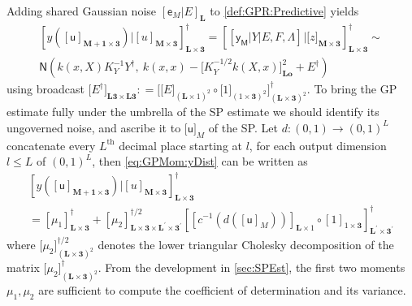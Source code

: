 \documentclass[preprint,12pt]{elsarticle}
\newcommand*{\M}[1]{\ensuremath{#1}\xspace}
\newcommand*{\x}{\times}
\newcommand*{\mi}[1]{\mathbf{#1}}
\newcommand*{\rv}[1]{\mathsf{#1}}
\newcommand*{\te}[2][]{\left\lbrack{#2}\right\rbrack_{#1}}
\newcommand*{\tte}[2][]{\lbrack{#2}\rbrack_{#1}}
\newcommand*{\deq}{\M{\mathrel{\mathop:}=}}
\newcommand*{\gauss}[2]{\mathsf{N}\!\left({#1,#2}\right)}
\begin{document}
    Adding shared Gaussian noise $\te[\mi{L}]{\rv{e}_M\vert E}$ to \cref{def:GPR:Predictive} yields
    \begin{multline}\label{eq:GPMom:yDist}
        \te[\mi{L\x 3}]{y(\te[\mi{M+1\x 3}]{\rv{u}}) \big\vert \te[\mi{M\x 3}]{u}}^{\dagger} 
        = \te[\mi{L\x 3}]{\te{\rv{y_M} \vert Y \vert E,F,\Lambda} \big\vert \tte[\mi{M\x 3}]{z}}^{\dagger} \sim \\
        \gauss{k(x,X) K_{Y}^{-1} Y^{\dagger}}{\ k(x,x) - \tte[\mi{Lo}]{K_{Y}^{-1/2} k(X,x)}^{2} + E^{\dagger}}
    \end{multline}
    using broadcast $\tte[\mi{L3\x L3}]{E^{\dagger}} \deq \tte[(\mi{L\x 3})^{2}]{\tte[(\mi{L}\x 1)^{2}]{E} \circ \tte[(1\x\mi{3})^{2}]{1}}^{\dagger}$. 
    To bring the GP estimate fully under the umbrella of the SP estimate we should identify its ungoverned noise, and ascribe it to $\tte[M]{\rv{u}}$ of the SP.
    Let $d\colon (0,1) \to (0,1)^{L}$ concatenate every $L^{\mathrm{th}}$ decimal place starting at $l$, for each output dimension $l\leq L$ of $(0,1)^{L}$, then \cref{eq:GPMom:yDist} can be written as
    \begin{multline}\label{eq:GPMom:yReveal}
        \te[\mi{L\x 3}]{y(\te[\mi{M+1\x 3}]{\rv{u}}) \big\vert \te[\mi{M\x 3}]{u}}^{\dagger} \\
        = \te[\mi{L\x 3}]{\mu_{1}}^{\dagger}
        + \te[\mi{L\x 3\x L^{\prime}\x 3^{\prime}}]{\mu_{2}}^{\dagger/2} \te[\mi{L^{\prime}\x 3^{\prime}}]{\te[\mi{L}\x 1]{c^{-1}\!\left(d\left(\te[M]{\rv{u}}\right)\right)} \circ \te[1\x\mi{3}]{1}}^{\dagger}
    \end{multline}
    where $\tte[(\mi{L\x 3})^{2}]{\mu_{2}}^{\dagger/2}$ denotes the lower triangular Cholesky decomposition of the matrix $\tte[(\mi{L\x 3})^{2}]{\mu_{2}}^{\dagger}$.
    From the development in \cref{sec:SPEst}, the first two moments $\mu_{1},\mu_{2}$ are sufficient to compute the coefficient of determination and its variance. 
    
\end{document}
